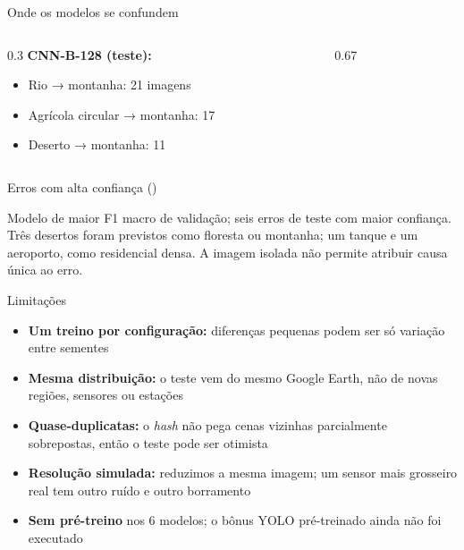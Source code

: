 \documentclass[aspectratio=169,10pt,t]{beamer}
\begin{document}
\begin{frame}{Onde os modelos se confundem}
\begin{columns}[T]
\begin{column}{0.3\textwidth}
\small
\textbf{CNN-B-128 (teste):}
\begin{itemize}
\item Rio → montanha: 21 imagens
\item Agrícola circular → montanha: 17
\item Deserto → montanha: 11
\end{itemize}
\end{column}
\begin{column}{0.67\textwidth}
\centering{}
\end{column}
\end{columns}
\end{frame}

\begin{frame}{Erros com alta confiança ()}
\centering{}
\vskip3mm
\raggedright\small Modelo de maior F1 macro de validação; seis erros de teste com maior confiança.\\
Três desertos foram previstos como floresta ou montanha; um tanque e um aeroporto, como residencial densa. A imagem isolada não permite atribuir causa única ao erro.
\end{frame}

\begin{frame}{Limitações}
\begin{itemize}
\item \textbf{Um treino por configuração:} diferenças pequenas podem ser só variação entre sementes
\item \textbf{Mesma distribuição:} o teste vem do mesmo Google Earth, não de novas regiões, sensores ou estações
\item \textbf{Quase-duplicatas:} o \textit{hash} não pega cenas vizinhas parcialmente sobrepostas, então o teste pode ser otimista
\item \textbf{Resolução simulada:} reduzimos a mesma imagem; um sensor mais grosseiro real tem outro ruído e outro borramento
\item \textbf{Sem pré-treino} nos 6 modelos; o bônus YOLO pré-treinado ainda não foi executado
\end{itemize}
\end{frame}
\end{document}
